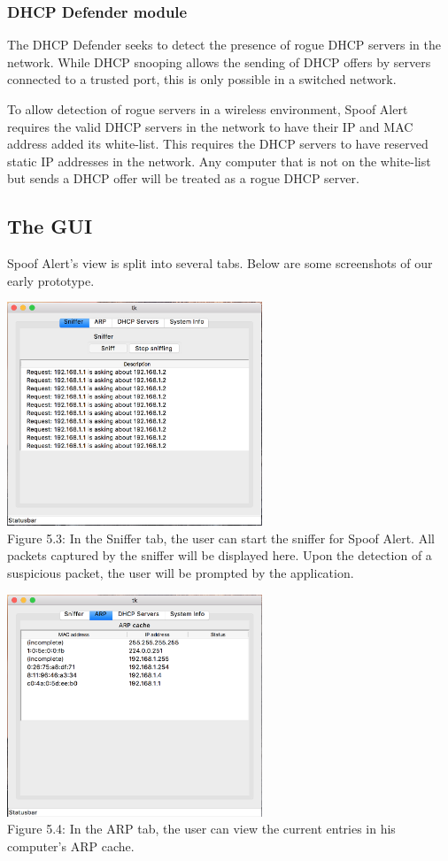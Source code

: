\documentclass{acm_proc_article-sp}
\begin{document}
\subsubsection{DHCP Defender module}

The DHCP Defender seeks to detect the presence of rogue DHCP servers in the network. While DHCP snooping allows the sending of DHCP offers by servers connected to a trusted port, this is only possible in a switched network. 

To allow detection of rogue servers in a wireless environment, Spoof Alert requires the valid DHCP servers in the network to have their IP and MAC address added its white-list. This requires the DHCP servers to have reserved static IP addresses in the network. Any computer that is not on the white-list but sends a DHCP offer will be treated as a rogue DHCP server. 

\subsection{The GUI}

Spoof Alert's view is split into several tabs. Below are some screenshots of our early prototype.

\includegraphics[width=3in]{architecture03.png} \\
Figure 5.3: In the Sniffer tab, the user can start the sniffer for Spoof Alert. All packets captured by the sniffer will be displayed here. Upon the detection of a suspicious packet, the user will be prompted by the application.

\includegraphics[width=3in]{architecture04.png} \\
Figure 5.4: In the ARP tab, the user can view the current entries in his computer’s ARP cache.
\end{document}
